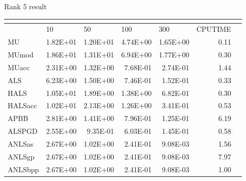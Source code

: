 \documentclass{article}
\begin{document}
Rank 5 result 
\begin{table}[H]
	\centering
	\begin{tabular}{|l|r|r|r|r|r|l|}
		\hline
		& \multicolumn{1}{l|}{}   & \multicolumn{1}{l|}{}   & \multicolumn{1}{l|}{}    & \multicolumn{1}{l|}{}    & \multicolumn{1}{l|}{}        &  \\ \hline
		& \multicolumn{1}{l|}{10} & \multicolumn{1}{l|}{50} & \multicolumn{1}{l|}{100} & \multicolumn{1}{l|}{300} & \multicolumn{1}{l|}{CPUTIME} &  \\ \hline
		MU       & 1.82E+01                & 1.20E+01                & 4.74E+00                 & 1.65E+00                 & 0.11                         &  \\ \hline
		MUmod    & 1.86E+01                & 1.31E+01                & 6.94E+00                 & 1.77E+00                 & 0.30                         &  \\ \hline
		MUacc    & 2.31E+00                & 1.32E+00                & 7.68E-01                 & 2.74E-01                 & 1.44                         &  \\ \hline
		ALS      & 6.23E+00                & 1.50E+00                & 7.46E-01                 & 1.52E-01                 & 0.33                         &  \\ \hline
		HALS     & 1.05E+01                & 1.89E+00                & 1.38E+00                 & 6.82E-01                 & 0.30                         &  \\ \hline
		HALSacc  & 1.02E+01                & 2.13E+00                & 1.26E+00                 & 3.41E-01                 & 0.53                         &  \\ \hline
		APBB     & 2.81E+00                & 1.41E+00                & 7.96E-01                 & 1.25E-01                 & 6.19                         &  \\ \hline
		ALSPGD   & 2.55E+00                & 9.35E-01                & 6.03E-01                 & 1.45E-01                 & 0.58                         &  \\ \hline
		ANLSas   & 2.67E+00                & 1.02E+00                & 2.41E-01                 & 9.08E-03                 & 1.56                         &  \\ \hline
		ANLSgp   & 2.67E+00                & 1.02E+00                & 2.41E-01                 & 9.08E-03                 & 7.97                         &  \\ \hline
		ANLSbpp  & 2.67E+00                & 1.02E+00                & 2.41E-01                 & 9.08E-03                 & 1.00                         &  \\ \hline

\end{tabular}
\end{table}
\end{document}
